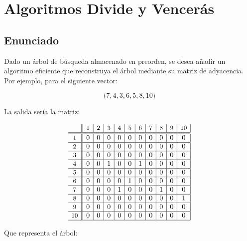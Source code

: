 \chapter{Algoritmos Divide y Vencerás}\label{dyv}

\section{Enunciado}\label{dyv-enunciado}

Dado un árbol de búsqueda almacenado en preorden, se desea añadir un algoritmo eficiente que reconstruya el árbol mediante su matriz de adyacencia.
Por ejemplo, para el siguiente vector:

\[\Big(7, 4, 3, 6, 5, 8, 10\Big)\]

La salida sería la matriz:

\[
\begin{array}{c||c|c|c|c|c|c|c|c|c|c|c}
& \text{\small{1}} & \text{\small{2}} & \text{\small{3}} & \text{\small{4}} & \text{\small{5}} & \text{\small{6}} & \text{\small{7}} & \text{\small{8}} & \text{\small{9}} & \text{\small{10}} \\
\hline
\hline
\text{\small{1}}  & 0 & 0 & 0 & 0 & 0 & 0 & 0 & 0 & 0 & 0 \\
\hline
\text{\small{2}}  & 0 & 0 & 0 & 0 & 0 & 0 & 0 & 0 & 0 & 0 \\
\hline
\text{\small{3}}  & 0 & 0 & 0 & 0 & 0 & 0 & 0 & 0 & 0 & 0 \\
\hline
\text{\small{4}}  & 0 & 0 & 1 & 0 & 0 & 1 & 0 & 0 & 0 & 0 \\
\hline
\text{\small{5}}  & 0 & 0 & 0 & 0 & 0 & 0 & 0 & 0 & 0 & 0 \\
\hline
\text{\small{6}}  & 0 & 0 & 0 & 0 & 1 & 0 & 0 & 0 & 0 & 0 \\
\hline
\text{\small{7}}  & 0 & 0 & 0 & 1 & 0 & 0 & 0 & 1 & 0 & 0 \\
\hline
\text{\small{8}}  & 0 & 0 & 0 & 0 & 0 & 0 & 0 & 0 & 0 & 1 \\
\hline
\text{\small{9}}  & 0 & 0 & 0 & 0 & 0 & 0 & 0 & 0 & 0 & 0 \\
\hline
\text{\small{10}} & 0 & 0 & 0 & 0 & 0 & 0 & 0 & 0 & 0 & 0 \\
\hline
\end{array}
\]

Que representa el árbol:

\begin{center}
\end{center}

